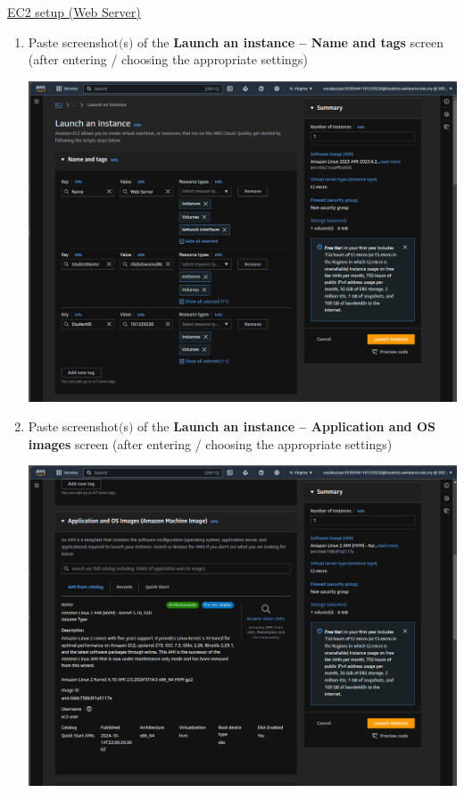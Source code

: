\documentclass[11pt]{article}
\begin{document}
\noindent\underline{EC2 setup (Web Server)}
\begin{enumerate}[resume]
    \item Paste screenshot$($s$)$ of the \textbf{Launch an instance – Name and tags} screen (after entering / choosing the appropriate settings) \\
    \vspace{5mm}

    {\centering
    \includegraphics[width=5.8in]{pics/15.png}
    }


    \item Paste screenshot$($s$)$ of the \textbf{Launch an instance – Application and OS images} screen (after entering / choosing the appropriate settings) \\
    \vspace{5mm}

    {\centering
    \includegraphics[width=5.8in]{pics/16.png}
    }



\end{enumerate}
\end{document}
